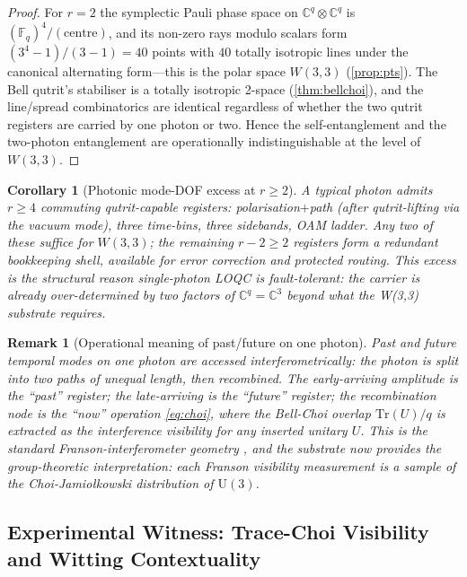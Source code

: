 ﻿\documentclass[12pt]{article}
\newtheorem{corollary}[theorem]{Corollary}
\newtheorem{remark}[theorem]{Remark}
\newcommand{\CC}{\mathbb{C}}
\newcommand{\GF}[1]{\mathbb{F}_{#1}}
\begin{document}
\begin{proof}
For $r = 2$ the symplectic Pauli phase space on $\CC^q\otimes\CC^q$ is
$(\GF{q})^4 / (\text{centre})$, and its non-zero rays modulo scalars form
$(3^4 - 1)/(3-1) = 40$ points with $40$ totally isotropic lines under the
canonical alternating form---this is the polar space $W(3,3)$
(\cref{prop:pts}).  The Bell qutrit's stabiliser is a totally isotropic
2-space (\cref{thm:bellchoi}), and the line/spread combinatorics are
identical regardless of whether the two qutrit registers are carried by one
photon or two.  Hence the self-entanglement and the two-photon entanglement
are operationally indistinguishable at the level of $W(3,3)$.
\end{proof}

\begin{corollary}[Photonic mode-DOF excess at $r \ge 2$]\label{cor:dof_excess}
A typical photon admits $r \ge 4$ commuting qutrit-capable registers:
polarisation$+$path (after qutrit-lifting via the vacuum mode), three time-bins,
three sidebands, OAM ladder.  Any \emph{two} of these suffice for $W(3,3)$;
the remaining $r - 2 \ge 2$ registers form a \emph{redundant} bookkeeping
shell, available for error correction and protected routing.  This excess is
the structural reason single-photon LOQC is fault-tolerant: the carrier is
already over-determined by two factors of $\CC^q = \CC^3$ beyond what the
W(3,3) substrate requires.
\end{corollary}

\begin{remark}[Operational meaning of past/future on one photon]
Past and future temporal modes on one photon are accessed
\emph{interferometrically}: the photon is split into two paths of unequal
length, then recombined.  The early-arriving amplitude is the ``past''
register; the late-arriving is the ``future'' register; the recombination
node is the ``now'' operation \eqref{eq:choi}, where the Bell-Choi overlap
$\mathrm{Tr}(U)/q$ is extracted as the interference visibility for any
inserted unitary $U$.  This is the standard Franson-interferometer geometry
\cite{Brendel1999,Marcikic2002}, and the substrate now provides the
group-theoretic interpretation: each Franson visibility measurement is a
sample of the Choi-Jamio\l kowski distribution of $\mathrm{U}(3)$.
\end{remark}

\subsection{Experimental Witness: Trace-Choi Visibility and Witting Contextuality}
\label{sec:witness}
\end{document}
